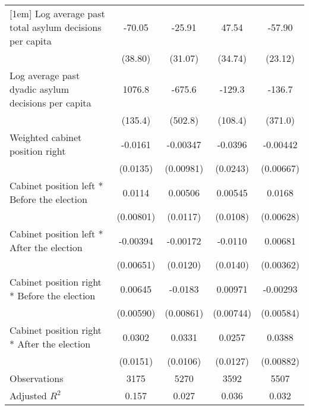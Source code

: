 \begin{table}[htbp]
\begin{tabular}{l*{4}{c}}
[1em]
Log average past total asylum decisions per capita&      -70.05         &      -25.91         &       47.54         &      -57.90\sym{*}  \\
                    &     (38.80)         &     (31.07)         &     (34.74)         &     (23.12)         \\
[1em]
Log average past dyadic asylum decisions per capita&      1076.8\sym{***}&      -675.6         &      -129.3         &      -136.7         \\
                    &     (135.4)         &     (502.8)         &     (108.4)         &     (371.0)         \\
[1em]
Weighted cabinet position right&     -0.0161         &    -0.00347         &     -0.0396         &    -0.00442         \\
                    &    (0.0135)         &   (0.00981)         &    (0.0243)         &   (0.00667)         \\
[1em]
Cabinet position left * Before the election&      0.0114         &     0.00506         &     0.00545         &      0.0168\sym{*}  \\
                    &   (0.00801)         &    (0.0117)         &    (0.0108)         &   (0.00628)         \\
[1em]
Cabinet position left * After the election&    -0.00394         &    -0.00172         &     -0.0110         &     0.00681         \\
                    &   (0.00651)         &    (0.0120)         &    (0.0140)         &   (0.00362)         \\
[1em]
Cabinet position right * Before the election&     0.00645         &     -0.0183         &     0.00971         &    -0.00293         \\
                    &   (0.00590)         &   (0.00861)         &   (0.00744)         &   (0.00584)         \\
[1em]
Cabinet position right * After the election&      0.0302         &      0.0331\sym{**} &      0.0257         &      0.0388\sym{***}\\
                    &    (0.0151)         &    (0.0106)         &    (0.0127)         &   (0.00882)         \\
\hline
Observations        &        3175         &        5270         &        3592         &        5507         \\
Adjusted \(R^{2}\)  &       0.157         &       0.027         &       0.036         &       0.032         \\

\end{tabular}
\end{table}
